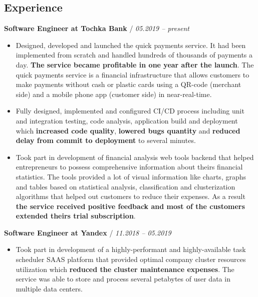 \documentclass[a4paper,10pt]{article}
\newcommand{\notice}[1]{{\textcolor{dark}{\textbf{#1}}}}
\newcommand{\info}[1]{{\textcolor{darkdark}{\textbf{#1}}}}
\begin{document}
\subsection*{Experience}

    \begin{adjustwidth}{10pt}{10pt}

        \notice{Software Engineer at Tochka Bank} / \textit{05.2019 – present}

        \begin{itemize}

        \item Designed, developed and launched the quick payments service. It had been implemented from scratch and handled hundreds of thousands of payments a day. \info{The service became profitable in one year after the launch}. The quick payments service is a financial infrastructure that allows customers to make payments without cash or plastic cards using a QR-code (merchant side) and a mobile phone app (customer side) in near-real-time.

        \item Fully designed, implemented and configured CI/CD process including unit and integration testing, code analysis, application build and deployment which \info{increased code quality}, \info{lowered bugs quantity} and \info{reduced delay from commit to deployment} to several minutes.

        \item Took part in development of financial analysis web tools backend that helped entrepreneurs to possess comprehensive information about theirs financial statistics. The tools provided a lot of visual information like charts, graphs and tables based on statistical analysis, classification and clusterization algorithms that helped out customers to reduce their expenses. As a result \info{the service received positive feedback and most of the customers extended theirs trial subscription}.

        \end{itemize}


        \notice{Software Engineer at Yandex} / \textit{11.2018 – 05.2019}

        \begin{itemize}

        \item Took part in development of a highly-performant and highly-available task scheduler SAAS platform that provided optimal company cluster resources utilization which \info{reduced the cluster maintenance expenses}. The service was able to store and process several petabytes of user data in multiple data centers.


\end{itemize}
\end{adjustwidth}
\end{document}
